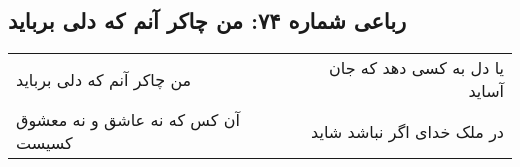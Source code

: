 \begin{center}
\section*{رباعی شماره ۷۴: من چاکر آنم که دلی برباید}
\label{sec:074}
\begin{longtable}{l p{0.5cm} r}
من چاکر آنم که دلی برباید
&&
یا دل به کسی دهد که جان آساید
\\
آن کس که نه عاشق و نه معشوق کسیست
&&
در ملک خدای اگر نباشد شاید
\\
\end{longtable}
\end{center}
